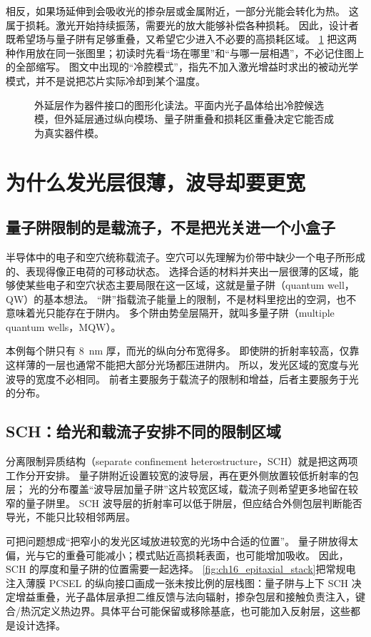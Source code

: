 相反，如果场延伸到会吸收光的掺杂层或金属附近，一部分光能会转化为热。
这属于损耗。激光开始持续振荡，需要光的放大能够补偿各种损耗。
因此，设计者既希望场与量子阱有足够重叠，又希望它少进入不必要的高损耗区域。
\cref{fig:ch16_epi_overlap_interface_map} 把这两种作用放在同一张图里；初读时先看“场在哪里”和“与哪一层相遇”，不必记住图上的全部缩写。
图文中出现的“冷腔模式”，指先不加入激光增益时求出的被动光学模式，并不是说把芯片实际冷却到某个温度。

\begin{figure}[htbp]
  \centering
  
  \caption{外延层作为器件接口的图形化读法。平面内光子晶体给出冷腔候选模，但外延层通过纵向模场、量子阱重叠和损耗区重叠决定它能否成为真实器件模。}
  \label{fig:ch16_epi_overlap_interface_map}
\end{figure}

\section{为什么发光层很薄，波导却要更宽}
\subsection{量子阱限制的是载流子，不是把光关进一个小盒子}
半导体中的电子和空穴统称载流子。空穴可以先理解为价带中缺少一个电子所形成的、表现得像正电荷的可移动状态。
选择合适的材料并夹出一层很薄的区域，能够使某些电子和空穴状态主要局限在这一区域，这就是量子阱（quantum well，QW）的基本想法。
“阱”指载流子能量上的限制，不是材料里挖出的空洞，也不意味着光只能存在于阱内。
多个阱由势垒层隔开，就叫多量子阱（multiple quantum wells，MQW）。

本例每个阱只有 \SI{8}{nm} 厚，而光的纵向分布宽得多。
即使阱的折射率较高，仅靠这样薄的一层也通常不能把大部分光场都压进阱内。
所以，发光区域的宽度与光波导的宽度不必相同。
前者主要服务于载流子的限制和增益，后者主要服务于光的分布。

\subsection{SCH：给光和载流子安排不同的限制区域}
分离限制异质结构（separate confinement heterostructure，SCH）就是把这两项工作分开安排。
量子阱附近设置较宽的波导层，再在更外侧放置较低折射率的包层；
光的分布覆盖“波导层加量子阱”这片较宽区域，载流子则希望更多地留在较窄的量子阱里。
SCH 波导层的折射率可以低于阱层，但应结合外侧包层判断能否导光，不能只比较相邻两层。

可把问题想成“把窄小的发光区域放进较宽的光场中合适的位置”。
量子阱放得太偏，光与它的重叠可能减小；模式贴近高损耗表面，也可能增加吸收。
因此，SCH 的厚度和量子阱的位置需要一起选择。
\cref{fig:ch16_epitaxial_stack}把常规电注入薄膜 PCSEL 的纵向接口画成一张未按比例的层栈图：量子阱与上下 SCH 决定增益重叠，光子晶体层承担二维反馈与法向辐射，掺杂包层和接触负责注入，键合/热沉定义热边界。具体平台可能保留或移除基底，也可能加入反射层，这些都是设计选择。


